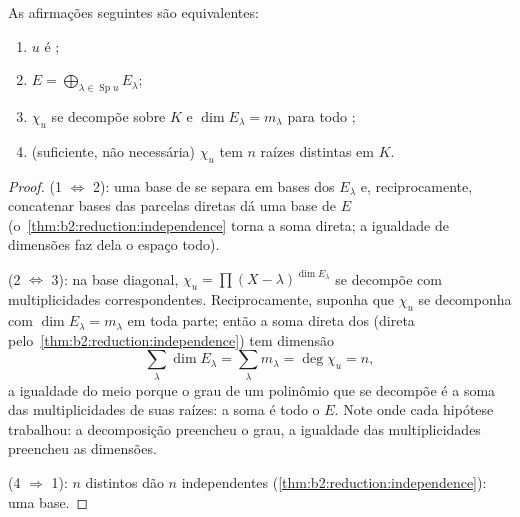 \begin{theorem}\label{thm:b2:reduction:diagcrit}
As afirmações seguintes são equivalentes:
\begin{enumerate}
  \item $u$ é ;
  \item $E = \bigoplus_{\lambda \in \operatorname{Sp} u} E_\lambda$;
  \item $\chi_u$ se decompõe sobre $K$ e $\dim E_\lambda = m_\lambda$
        para todo ;
  \item (suficiente, não necessária) $\chi_u$ tem $n$ raízes distintas
        em $K$.
\end{enumerate}
\end{theorem}

\begin{proof}
(1 $\iff$ 2): uma base de  se separa em bases dos
$E_\lambda$ e, reciprocamente, concatenar bases das parcelas
diretas dá uma base de $E$
(o~\cref{thm:b2:reduction:independence} torna a soma direta; a igualdade
de dimensões faz dela o espaço todo).

(2 $\iff$ 3): na base diagonal, $\chi_u = \prod (X -
\lambda)^{\dim E_\lambda}$ se decompõe com multiplicidades correspondentes.
Reciprocamente, suponha que $\chi_u$ se decomponha com $\dim E_\lambda =
m_\lambda$ em toda parte; então a soma direta dos 
(direta pelo~\cref{thm:b2:reduction:independence}) tem dimensão
\[
\sum_{\lambda}\dim E_\lambda = \sum_{\lambda} m_\lambda =
\deg\chi_u = n ,
\]
a igualdade do meio porque o grau de um polinômio que se decompõe é a
soma das multiplicidades de suas raízes: a soma é todo o $E$. Note
onde cada hipótese trabalhou: a decomposição preencheu o grau,
a igualdade das multiplicidades preencheu as dimensões.

(4 $\Rightarrow$ 1): $n$  distintos dão $n$ 
independentes (\cref{thm:b2:reduction:independence}): uma base.
\end{proof}

